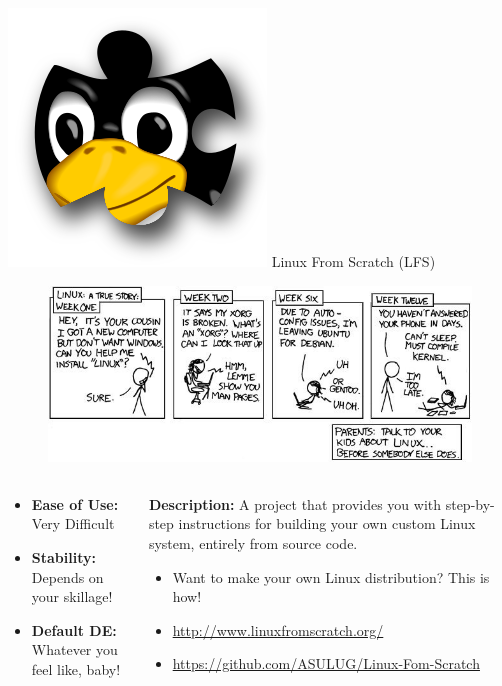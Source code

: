 \documentclass[11pt]{beamer}
\begin{document}
\begin{frame}{\includegraphics[scale=0.07]{lfs-logo.png} Linux From Scratch (LFS)}
	\begin{figure}
		\includegraphics[scale=0.3]{xkcd.jpg}
	\end{figure}
	\begin{columns}
		\small
		\begin{column}{0.35\textwidth}
			\begin{itemize}
				\item \textbf{Ease of Use:} Very Difficult
				\item \textbf{Stability:} Depends on your skillage!
				\item \textbf{Default DE:} Whatever you feel like, baby!
			\end{itemize}
		\end{column}
		\begin{column}{0.65\textwidth}
			\small
			\textbf{Description:} A project that provides you with step-by-step instructions for building your own custom Linux system, entirely from source code.
			\begin{itemize}
				\item Want to make your own Linux distribution? This is how!
				\item {\color{blue}\url{ http://www.linuxfromscratch.org/}}
				\item {\color{blue}\url{https://github.com/ASULUG/Linux-Fom-Scratch}}
			\end{itemize}
		\end{column}
	\end{columns}
\end{frame}
\end{document}
